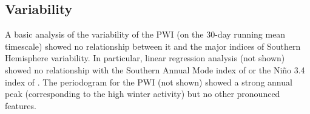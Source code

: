 \subsection{Variability}

A basic analysis of the variability of the PWI (on the 30-day running mean timescale) showed no relationship between it and the major indices of Southern Hemisphere variability. In particular, linear regression analysis (not shown) showed no relationship with the Southern Annual Mode index of \citet{Marshall2003} or the Ni\~{n}o 3.4 index of \citet{Trenberth2001}. The periodogram for the PWI (not shown) showed a strong annual peak (corresponding to the high winter activity) but no other pronounced features.